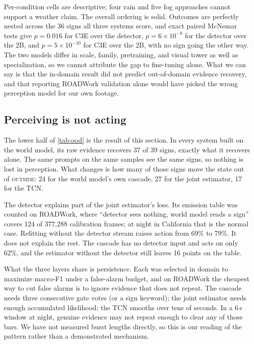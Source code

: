 \documentclass[journal]{IEEEtran}
\newcommand{\st}[1]{\textsc{#1}}
\begin{document}
Per-condition cells are descriptive; four rain and five fog approaches cannot support a weather claim.  The overall ordering is solid.  Outcomes are perfectly nested across the 36 signs all three systems score, and exact paired McNemar tests give $p=0.016$ for C3E over the detector, $p=6\times10^{-8}$ for the detector over the 2B, and $p=5\times10^{-10}$ for C3E over the 2B, with no sign going the other way.  The two models differ in scale, family, pretraining, and visual tower as well as specialization, so we cannot attribute the gap to fine-tuning alone.  What we can say is that the in-domain result did not predict out-of-domain evidence recovery, and that reporting ROADWork validation alone would have picked the wrong perception model for our own footage.

\subsection{Perceiving is not acting}

The lower half of \cref{tab:ood} is the result of this section.  In every system built on the world model, its raw evidence recovers 37 of 39 signs, exactly what it recovers alone.  The same prompts on the same samples see the same signs, so nothing is lost in perception.  What changes is how many of those signs move the state out of \st{outside}: 24 for the world model's own cascade, 27 for the joint estimator, 17 for the TCN.

The detector explains part of the joint estimator's loss.  Its emission table was counted on ROADWork, where ``detector sees nothing, world model reads a sign'' covers 124 of 377{,}288 calibration frames; at night in California that is the normal case.  Refitting without the detector stream raises action from 69\% to 79\%.  It does not explain the rest.  The cascade has no detector input and acts on only 62\%, and the estimator without the detector still leaves 16 points on the table.

What the three layers share is persistence.  Each was selected in domain to maximize macro-F1 under a false-alarm budget, and on ROADWork the cheapest way to cut false alarms is to ignore evidence that does not repeat.  The cascade needs three consecutive gate votes (or a sign keyword); the joint estimator needs enough accumulated likelihood; the TCN smooths over tens of seconds.  In a 6\,s window at night, genuine evidence may not repeat enough to clear any of those bars.  We have not measured burst lengths directly, so this is our reading of the pattern rather than a demonstrated mechanism.
\end{document}
